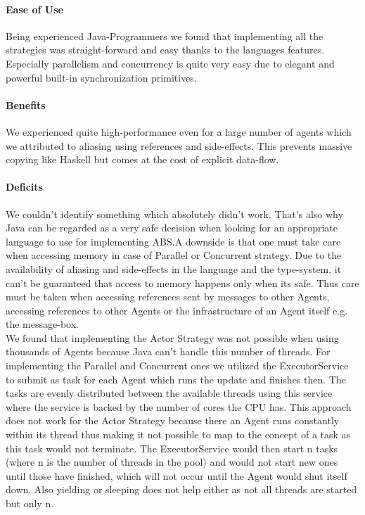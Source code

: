 \paragraph{Ease of Use}
Being experienced Java-Programmers we found that implementing all the strategies was straight-forward and easy thanks to the languages features. Especially parallelism and concurrency is quite very easy due to elegant and powerful built-in synchronization primitives.

\paragraph{Benefits}
We experienced quite high-performance even for a large number of agents which we attributed to aliasing using references and side-effects. This prevents massive copying like Haskell but comes at the cost of explicit data-flow.

\paragraph{Deficits}
We couldn't identify something which absolutely didn't work. That's also why Java can be regarded as a very safe decision when looking for an appropriate language to use for implementing ABS.A downside is that one must take care when accessing memory in case of Parallel or Concurrent strategy. Due to the availability of aliasing and side-effects in the language and the type-system, it can't be guaranteed that access to memory happens only when its safe. Thus care must be taken when accessing references sent by messages to other Agents, accessing references to other Agents or the infrastructure of an Agent itself e.g. the message-box. \\
We found that implementing the Actor Strategy was not possible when using thousands of Agents because Java can't handle this number of threads. For implementing the Parallel and Concurrent ones we utilized the ExecutorService to submit as task for each Agent which runs the update and finishes then. The tasks are evenly distributed between the available threads using this service where the service is backed by the number of cores the CPU has. This approach does not work for the Actor Strategy because there an Agent runs constantly within its thread thus making it not possible to map to the concept of a task as this task would not terminate. The ExecutorService would then start n tasks (where n is the number of threads in the pool) and would not start new ones until those have finished, which will not occur until the Agent would shut itself down. Also yielding or sleeping does not help either as not all threads are started but only n. 

